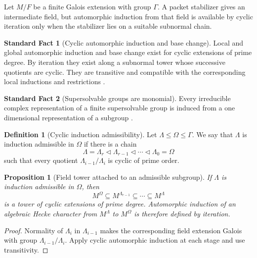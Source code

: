 \documentclass{aomart}
\newtheorem{proposition}[proposition]{Proposition}
\theoremstyle{definition}
\newtheorem{definition}[definition]{Definition}
\newtheorem{standardfact}[standardfact]{Standard Fact}
\theoremstyle{remark}
\begin{document}
Let \(M/F\) be a finite Galois extension with group \(\Gamma\). A packet stabilizer gives an intermediate field, but automorphic induction from that field is available by cyclic iteration only when the stabilizer lies on a suitable subnormal chain.

\begin{standardfact}[Cyclic automorphic induction and base change]\label{fact:solvable_ai}
Local and global automorphic induction and base change exist for cyclic extensions of prime degree. By iteration they exist along a subnormal tower whose successive quotients are cyclic. They are transitive and compatible with the corresponding local inductions and restrictions \cite{ArthurClozel1989}.
\end{standardfact}

\begin{standardfact}[Supersolvable groups are monomial]\label{fact:supersolvable_monomial}
Every irreducible complex representation of a finite supersolvable group is induced from a one dimensional representation of a subgroup \cite{Isaacs1976}.
\end{standardfact}

\begin{definition}[Cyclic induction admissibility]\label{def:ai_admissible}
Let \(\Lambda\leq\Omega\leq\Gamma\). We say that \(\Lambda\) is induction admissible in \(\Omega\) if there is a chain
\[
\Lambda=\Lambda_r
\triangleleft
\Lambda_{r-1}
\triangleleft\cdots\triangleleft
\Lambda_0=\Omega
\]
such that every quotient \(\Lambda_{i-1}/\Lambda_i\) is cyclic of prime order.
\end{definition}

\begin{proposition}[Field tower attached to an admissible subgroup]\label{prop:ai_field_tower}
If \(\Lambda\) is induction admissible in \(\Omega\), then
\[
M^\Omega
\subseteq
M^{\Lambda_{r-1}}
\subseteq\cdots\subseteq
M^\Lambda
\]
is a tower of cyclic extensions of prime degree. Automorphic induction of an algebraic Hecke character from \(M^\Lambda\) to \(M^\Omega\) is therefore defined by iteration.
\end{proposition}

\begin{proof}
Normality of \(\Lambda_i\) in \(\Lambda_{i-1}\) makes the corresponding field extension Galois with group \(\Lambda_{i-1}/\Lambda_i\). Apply cyclic automorphic induction at each stage and use transitivity.
\end{proof}
\end{document}
